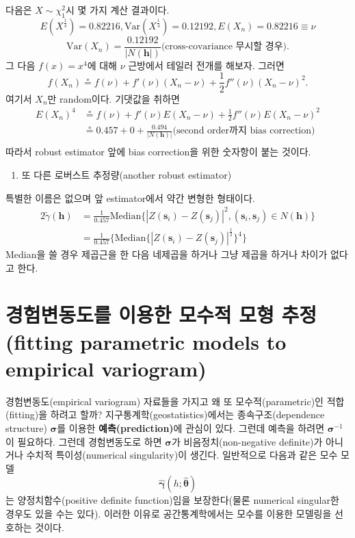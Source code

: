 \documentclass[b5paper,]{scrbook}
\providecommand{\tightlist}{%
  \setlength{\itemsep}{0pt}\setlength{\parskip}{0pt}}
\theoremstyle{plain}
\theoremstyle{definition}
\numberwithin{equation}{section}
\begin{document}
다음은 \(X \sim \chi_{1}^{2}\)시 몇 가지 계산 결과이다.
\[E(X^{\frac{1}{4}})=0.82216, \text{Var}(X^{\frac{1}{4}})=0.12192, E(X_{n})=0.82216 \equiv \nu\]
\[\text{Var}(X_{n})=\frac{0.12192}{|N(\mathbf{h}|)} \text{(cross-covariance 무시할 경우)} .\]
그 다음 \(f(x)=x^{4}\)에 대해 \(\nu\) 근방에서 테일러 전개를 해보자. 그러면
\[f(X_{n})\circeq f(\nu) +f'(\nu)(X_{n}-\nu)+\frac{1}{2}f''(\nu)(X_{n}-\nu)^{2} .\]
여기서 \(X_{n}\)만 random이다. 기댓값을 취하면
\[
\begin{aligned}
E(X_{n})^{4}&\circeq f(\nu) + f'(\nu)E(X_{n}-\nu) +\frac{1}{2}f''(\nu)E(X_{n}-\nu)^{2}\\
&\circeq 0.457 + 0 +\frac{0.494}{|N(\mathbf{h})|} \text{(second order까지 bias correction)}\\
\end{aligned}
\]
따라서 robust estimator 앞에 bias correction을 위한 숫자항이 붙는 것이다.

\begin{enumerate}
\def\labelenumi{\arabic{enumi}.}
\setcounter{enumi}{2}
\tightlist
\item
  또 다른 로버스트 추정량(another robust estimator)
\end{enumerate}

특별한 이름은 없으며 앞 estimator에서 약간 변형한 형태이다.
\[
\begin{aligned}
2\tilde{\gamma}(\mathbf{h})&=\frac{1}{0.457}\text{Median}\{ |Z(\mathbf{s}_{i})-Z(\mathbf{s}_{j})|^{2} , (\mathbf{s}_{i},\mathbf{s}_{j})\in N(\mathbf{h}) \}\\
&=\frac{1}{0.457}\{\text{Median} \{ |Z(\mathbf{s}_{i})-Z(\mathbf{s}_{j})|^{\frac{1}{2}} \}^{4} \}
\end{aligned}
\]
Median을 쓸 경우 제곱근을 한 다음 네제곱을 하거나 그냥 제곱을 하거나 차이가 없다고 한다.

\hypertarget{----fitting-parametric-models-to-empirical-variogram}{%
\section{경험변동도를 이용한 모수적 모형 추정(fitting parametric models to empirical variogram)}\label{----fitting-parametric-models-to-empirical-variogram}}

경험변동도(empirical variogram) 자료들을 가지고 왜 또 모수적(parametric)인 적합(fitting)을 하려고 할까? 지구통계학(geostatistics)에서는 종속구조(dependence structure) \(\boldsymbol{\sigma}\)를 이용한 \textbf{예측(prediction)}에 관심이 있다. 그런데 예측을 하려면 \(\boldsymbol{\sigma}^{-1}\)이 필요하다. 그런데 경험변동도로 하면 \(\boldsymbol{\sigma}\)가 비음정치(non-negative definite)가 아니거나 수치적 특이성(numerical singularity)이 생긴다. 일반적으로 다음과 같은 모수 모델
\[\hat{\boldsymbol{\gamma}}(h;\hat{\boldsymbol{\theta}})\]
는 양정치함수(positive definite function)임을 보장한다(물론 numerical singular한 경우도 있을 수는 있다). 이러한 이유로 공간통계학에서는 모수를 이용한 모델링을 선호하는 것이다.
\end{document}
